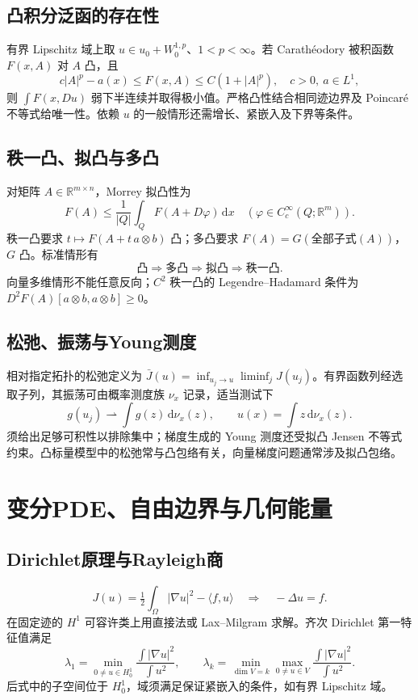 \documentclass[../main.tex]{subfiles}
\begin{document}
\subsection{凸积分泛函的存在性}
有界 Lipschitz 域上取 $u\in u_0+W_0^{1,p}$、$1<p<\infty$。若 Carathéodory 被积函数 $F(x,A)$ 对 $A$ 凸，且
\[
c|A|^p-a(x)\le F(x,A)\le C(1+|A|^p),\quad c>0,\ a\in L^1,
\]
则 $\int F(x,Du)$ 弱下半连续并取得极小值。严格凸性结合相同迹边界及 Poincaré 不等式给唯一性。依赖 $u$ 的一般情形还需增长、紧嵌入及下界等条件。
\subsection{秩一凸、拟凸与多凸}
对矩阵 $A\in\mathbb R^{m\times n}$，Morrey 拟凸性为
\[
F(A)\le\frac1{|Q|}\int_QF(A+D\varphi)\,\mathrm dx\quad(\varphi\in C_c^\infty(Q;\mathbb R^m)).
\]
秩一凸要求 $t\mapsto F(A+t\,a\otimes b)$ 凸；多凸要求 $F(A)=G(\text{全部子式}(A))$，$G$ 凸。标准情形有
\[
\text{凸}\Rightarrow\text{多凸}\Rightarrow\text{拟凸}\Rightarrow\text{秩一凸}.
\]
向量多维情形不能任意反向；$C^2$ 秩一凸的 Legendre--Hadamard 条件为 $D^2F(A)[a\otimes b,a\otimes b]\ge0$。
\subsection{松弛、振荡与Young测度}
相对指定拓扑的松弛定义为 $\bar J(u)=\inf_{u_j\to u}\liminf_jJ(u_j)$。有界函数列经选取子列，其振荡可由概率测度族 $\nu_x$ 记录，适当测试下
\[
g(u_j)\rightharpoonup \int g(z)\,\mathrm d\nu_x(z),\qquad
u(x)=\int z\,\mathrm d\nu_x(z).
\]
须给出足够可积性以排除集中；梯度生成的 Young 测度还受拟凸 Jensen 不等式约束。凸标量模型中的松弛常与凸包络有关，向量梯度问题通常涉及拟凸包络。
\section{变分PDE、自由边界与几何能量}
\subsection{Dirichlet原理与Rayleigh商}
\[
J(u)=\tfrac12\int_\Omega|\nabla u|^2-\langle f,u\rangle
\quad\Longrightarrow\quad-\Delta u=f.
\]
在固定迹的 $H^1$ 可容许类上用直接法或 Lax--Milgram 求解。齐次 Dirichlet 第一特征值满足
\[
\lambda_1=\min_{0\ne u\in H_0^1}\frac{\int|\nabla u|^2}{\int u^2},\qquad
\lambda_k=\min_{\dim V=k}\max_{0\ne u\in V}\frac{\int|\nabla u|^2}{\int u^2}.
\]
后式中的子空间位于 $H_0^1$，域须满足保证紧嵌入的条件，如有界 Lipschitz 域。
\end{document}

